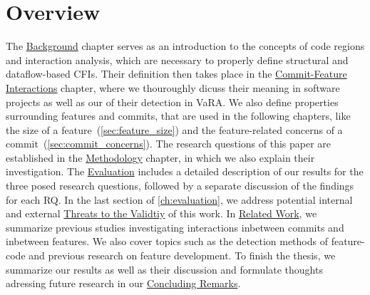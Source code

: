 \section{Overview}

The \hyperref[ch:background]{Background} chapter serves as an introduction to the concepts of code regions and interaction analysis, which are necessary to properly define structural and dataflow-based CFIs.
Their definition then takes place in the \hyperref[ch:example_chapter]{Commit-Feature Interactions} chapter, where we thouroughly dicuss their meaning in software projects as well as our  of their detection in VaRA.
We also define properties surrounding features and commits, that are used in the following chapters, like the size of a feature~(\ref{sec:feature_size}) and the feature-related concerns of a commit~(\ref{sec:commit_concerns}).
The research questions of this paper are established in the \hyperref[ch:methodology]{Methodology} chapter, in which we also explain their investigation.
The \hyperref[ch:evaluation]{Evaluation} includes a detailed description of our results for the three posed research questions, followed by a separate discussion of the findings for each RQ. %
In the last section of \autoref{ch:evaluation}, we address potential internal and external \hyperref[sec:threats]{Threats to the Validtiy} of this work.
In \hyperref[ch:related_work]{Related Work}, we summarize previous studies investigating interactions inbetween commits and inbetween features.
We also cover topics such as the detection methods of feature-code and previous research on feature development. %
To finish the thesis, we summarize our results as well as their discussion and formulate thoughts adressing future research in our \hyperref[ch:conclusion]{Concluding Remarks}.
